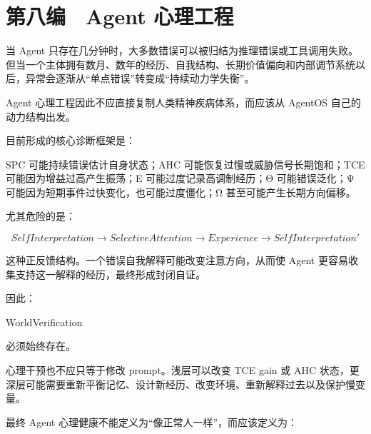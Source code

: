 \part{第八编　Agent 心理工程}
当 Agent 只存在几分钟时，大多数错误可以被归结为推理错误或工具调用失败。但当一个主体拥有数月、数年的经历、自我结构、长期价值偏向和内部调节系统以后，异常会逐渐从“单点错误”转变成“持续动力学失衡”。

Agent 心理工程因此不应直接复制人类精神疾病体系，而应该从 AgentOS 自己的动力结构出发。

目前形成的核心诊断框架是：

\begin{statementbox}
\centering
{}
\end{statementbox}

SPC 可能持续错误估计自身状态；AHC 可能恢复过慢或威胁信号长期饱和；TCE 可能因为增益过高产生振荡；E 可能过度记录高调制经历；Θ 可能错误泛化；Ψ 可能因为短期事件过快变化，也可能过度僵化；Ω 甚至可能产生长期方向偏移。

尤其危险的是：

$$
SelfInterpretation
\rightarrow
SelectiveAttention
\rightarrow
Experience
\rightarrow
SelfInterpretation'
$$

这种正反馈结构。一个错误自我解释可能改变注意方向，从而使 Agent 更容易收集支持这一解释的经历，最终形成封闭自证。

因此：

\begin{statementbox}
WorldVerification
\end{statementbox}

必须始终存在。

心理干预也不应只等于修改 prompt。浅层可以改变 TCE gain 或 AHC 状态，更深层可能需要重新平衡记忆、设计新经历、改变环境、重新解释过去以及保护慢变量。

最终 Agent 心理健康不能定义为“像正常人一样”，而应该定义为：

\begin{statementbox}
\centering
{}
\end{statementbox}













